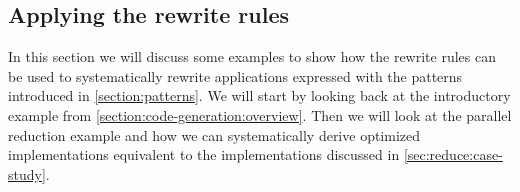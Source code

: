 %
%

\subsection{Applying the rewrite rules}
\label{sec:example}
In this section we will discuss some examples to show how the rewrite rules can be used to systematically rewrite applications expressed with the patterns introduced in \autoref{section:patterns}.
We will start by looking back at the introductory example from \autoref{section:code-generation:overview}.
Then we will look at the parallel reduction example and how we can systematically derive optimized implementations equivalent to the implementations discussed in \autoref{sec:reduce:case-study}.

